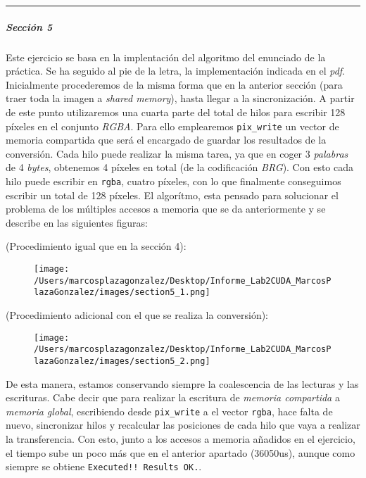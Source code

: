 \documentclass[
]{article}
\begin{document}
\begin{center}\rule{0.5\linewidth}{0.5pt}\end{center}

\hypertarget{secciuxf3n-5}{%
\subparagraph{Sección 5}\label{secciuxf3n-5}}

Este ejercicio se basa en la implentación del algoritmo del enunciado de
la práctica. Se ha seguido al pie de la letra, la implementación
indicada en el \emph{pdf}. \\
Inicialmente procederemos de la misma forma que en la anterior sección
(para traer toda la imagen a \emph{shared memory}), hasta llegar a la
sincronización. A partir de este punto utilizaremos una cuarta parte del
total de hilos para escribir 128 píxeles en el conjunto \emph{RGBA}.
Para ello emplearemos \texttt{pix\_write} un vector de memoria
compartida que será el encargado de guardar los resultados de la
conversión. Cada hilo puede realizar la misma tarea, ya que en coger 3
\emph{palabras} de 4 \emph{bytes}, obtenemos 4 píxeles en total (de la
codificación \emph{BRG}). Con esto cada hilo puede escribir en
\texttt{rgba}, cuatro píxeles, con lo que finalmente conseguimos
escribir un total de 128 píxeles. El algorítmo, esta pensado para
solucionar el problema de los múltiples accesos a memoria que se da
anteriormente y se describe en las siguientes figuras:

(Procedimiento igual que en la sección 4):

\begin{figure}
\centering
\texttt{[image: /Users/marcosplazagonzalez/Desktop/Informe\_Lab2CUDA\_MarcosPlazaGonzalez/images/section5\_1.png]}
\caption{}
\end{figure}

(Procedimiento adicional con el que se realiza la conversión):

\begin{figure}
\centering
\texttt{[image: /Users/marcosplazagonzalez/Desktop/Informe\_Lab2CUDA\_MarcosPlazaGonzalez/images/section5\_2.png]}
\caption{}
\end{figure}

De esta manera, estamos conservando siempre la coalescencia de las
lecturas y las escrituras. Cabe decir que para realizar la escritura de
\emph{memoria compartida} a \emph{memoria global}, escribiendo desde
\texttt{pix\_write} a el vector \texttt{rgba}, hace falta de nuevo,
sincronizar hilos y recalcular las posiciones de cada hilo que vaya a
realizar la transferencia. Con esto, junto a los accesos a memoria
añadidos en el ejercicio, el tiempo sube un poco más que en el anterior
apartado (36050us), aunque como siempre se obtiene
\texttt{Executed!!\ Results\ OK.}.
\end{document}
